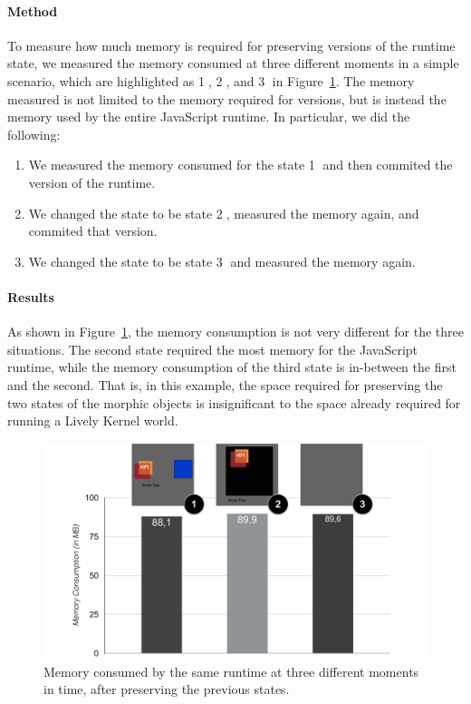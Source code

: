 \paragraph{Method}
To measure how much memory is required for preserving versions of the runtime state, we measured the memory consumed at three different moments in a simple scenario, which are highlighted as \textcircled{1}, \textcircled{2}, and \textcircled{3} in Figure~\ref{fig:MemoryOverheadForVersions}.
The memory measured is not limited to the memory required for versions, but is instead the memory used by the entire JavaScript runtime.
In particular, we did the following:
\begin{enumerate}
    \item We measured the memory consumed for the state \textcircled{1} and then commited the version of the runtime.
    \item We changed the state to be state \textcircled{2}, measured the memory again, and commited that version.
    \item We changed the state to be state \textcircled{3} and measured the memory again.
\end{enumerate}

\paragraph{Results}
As shown in Figure~\ref{fig:MemoryOverheadForVersions}, the memory consumption is not very different for the three situations.
The second state required the most memory for the JavaScript runtime, while the memory consumption of the third state is in-between the first and the second.
That is, in this example, the space required for preserving the two states of the morphic objects is insignificant to the space already required for running a Lively Kernel world.

\begin{figure}[h]
    \centering
    \includegraphics[width=\textwidth]{figures/6_evaluation/2_memoryForVersions.pdf}
    \caption{Memory consumed by the same runtime at three different moments in time, after preserving the previous states.}
    \label{fig:MemoryOverheadForVersions}
\end{figure}


